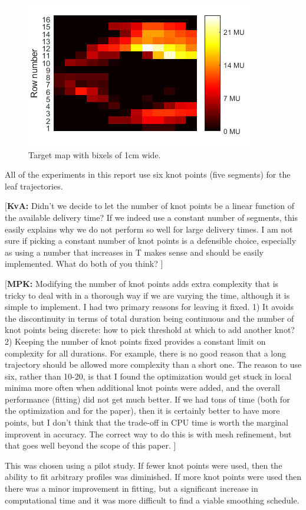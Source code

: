\documentclass{iopart}
\newcommand{\MPKcomment}[1]{{\color{magenta}\par {[{\bf MPK: } { #1}} ] \\    }}
\newcommand{\KvAcomment}[1]{{\color{magenta}\par {[{\bf KvA: } { #1}} ] \\    }}
\begin{document}
\begin{figure}
  \centering
  \includegraphics[]{fig/FIG_origMap_numbered.png}
  \caption{Target map with bixels of 1cm wide.}
  \label{fig:targetmap}
\end{figure}

All of the experiments in this report use six knot points (five segments) for the leaf trajectories.
\KvAcomment{Didn't we decide to let the number of knot points be a linear function of the available delivery time? If we indeed use a constant number of segments, this easily explains why we do not perform so well for large delivery times. I am not sure if picking a constant number of knot points is a defensible choice, especially as using a number that increases in T makes sense and should be easily implemented. What do both of you think?}
\MPKcomment{Modifying the number of knot points adds extra complexity that is tricky to deal with in a thorough way if we are varying the time, although it is simple to implement. I had two primary reasons for leaving it fixed. 1) It avoids the discontinuity in terms of total duration being continuous and the number of knot points being discrete: how to pick threshold at which to add another knot? 2) Keeping the number of knot points fixed provides a constant limit on complexity for all durations. For example, there is no good reason that a long trajectory should be allowed more complexity than a short one. The reason to use six, rather than 10-20, is that I found 
the optimization would get stuck in local minima more often when additional knot points
were added, and the overall performance (fitting) did not get much better. If we had tons of time (both for the optimization and for the paper), then it is certainly better to have more points, but I don't think that the trade-off in CPU time is worth the marginal improvent in accuracy. The correct way to do this is with mesh refinement, but that goes well beyond the scope of this paper.}
This was  chosen  using  a  pilot  study.  
If  fewer  knot points were  used,  then  the  ability  to  fit  arbitrary  profiles  was diminished.   
If  more  knot points  were  used  then  there  was  a  minor  improvement  in  fitting,  but  a  significant increase in computational time and it was more difficult to find a viable smoothing schedule.
\end{document}
